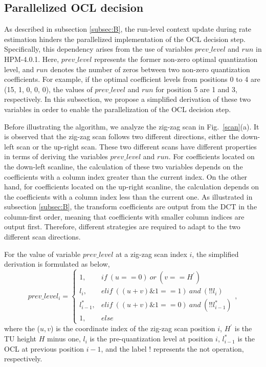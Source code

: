 \documentclass[lettersize,journal]{IEEEtran}
\begin{document}
\subsection{Parallelized OCL decision} 
\label{subsecOCL:B}
As described in subsection \ref{subsec:B}, the run-level context update during rate estimation hinders the parallelized implementation of the OCL decision step. Specifically, this dependency arises from the use of variables $prev\_level$ and $run$ in HPM-4.0.1. Here, $prev\_level$ represents the former non-zero optimal quantization level, and $run$ denotes the number of zeros between two non-zero quantization coefficients. For example, if the optimal coefficient levels from positions 0 to 4 are (15, 1, 0, 0, 0), the values of $prev\_level$ and $run$ for position 5 are 1 and 3, respectively. In this subsection, we propose a simplified derivation of these two variables in order to enable the parallelization of the OCL decision step. 

Before illustrating the algorithm, we analyze the zig-zag scan in Fig.~\ref{scan}(a). It is observed that the zig-zag scan follows two different directions, either the down-left scan or the up-right scan. These two different scans have different properties in terms of deriving the variables $prev\_level$ and $run$. For coefficients located on the down-left scanline, the calculation of these two variables depends on the coefficients with a column index greater than the current index. On the other hand, for coefficients located on the up-right scanline, the calculation depends on the coefficients with a column index less than the current one. As illustrated in subsection \ref{subsec:B}, the transform coefficients are output from the DCT in the column-first order, meaning that coefficients with smaller column indices are output first. Therefore, different strategies are required to adapt to the two different scan directions. 

For the value of variable $prev\_level$ at a zig-zag scan index $i$, the simplified derivation is formulated as below, 
\begin{equation}
	prev\_level_{i} =\begin{cases}
		\label{prevlevel}
		1,           & if \ (u==0)\ or\ (v==H^{'}) \\
		l_{i},       & elif \ ((u+v)\&1==1)\ and\ (!!l_{i}) \\
		l_{i-1}^{*}, & elif \ ((u+v)\&1==0)\ and\ (!!l_{i-1}^{*}) \\
            1,        & else 
	\end{cases},
\end{equation}
where the ($u, v$) is the coordinate index of the zig-zag scan position $i$, $H^{'}$ is the TU height $H$ minus one, $l_{i}$ is the pre-quantization level at position $i$, $l_{i-1}^{*}$ is the OCL at previous position $i-1$, and the label ! represents the not operation, respectively. 
\end{document}
